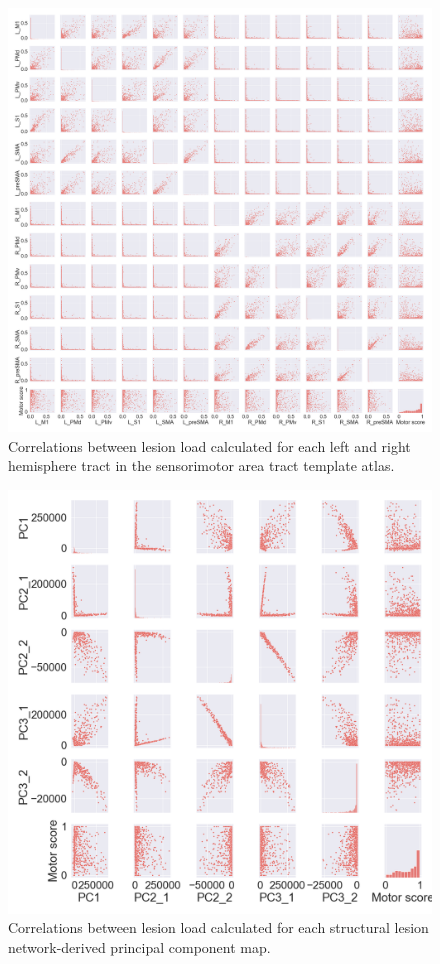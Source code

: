 \documentclass[10pt]{article}
\begin{document}
\begin{figure}[ht]
\centering
\includegraphics[width=1\linewidth]{figures/SMATT_bi_scatterplts.png}
\caption{Correlations between lesion load calculated for each left and right hemisphere tract in the sensorimotor area tract template atlas.}
\label{smatt_pairwise_correlations_bi}
\end{figure}
\begin{figure}[ht]
\centering
\includegraphics[width=1\linewidth]{figures/slnmvalues_scatterplts.png}
\caption{Correlations between lesion load calculated for each structural lesion network-derived principal component map.}
\label{slnm_distribution}
\end{figure}
\end{document}
